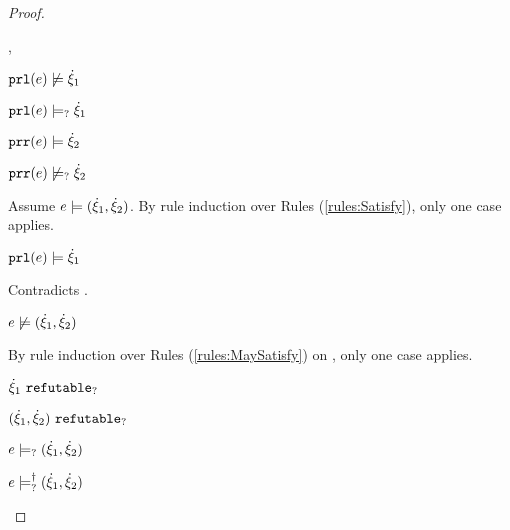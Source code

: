 \begin{proof}
\begin{byCases}
\begin{byCases}
\begin{byCases}
        \item[\cmaysatisfy{\hprl{e}}{\hxi_1},\csatisfy{\hprr{e}}{\hxi_2}]
            \begin{pfsteps*}
            \item $\mathtt{prl}(e) \not\models \dot{\xi}_1$  
            \item $\mathtt{prl}(e) \models_{?} \dot{\xi}_1$  
            \item $\mathtt{prr}(e) \models \dot{\xi}_2$  
            \item $\mathtt{prr}(e) \not\models_{?} \dot{\xi}_2$  
            \end{pfsteps*}
            Assume $e \models (\dot{\xi}_1 , \dot{\xi}_2)$. By rule induction over Rules (\ref{rules:Satisfy}), only one case applies.
            \begin{byCases}
            \item[\text{(\ref{rule:CSNotIntroPair})}]
                \begin{pfsteps*}
                \item $\mathtt{prl}(e) \models \dot{\xi}_1$ 
                \end{pfsteps*}
                Contradicts .
            \end{byCases}
            \begin{pfsteps*}
            \item $e \not\models (\dot{\xi}_1 , \dot{\xi}_2)$  
            \end{pfsteps*}
            By rule induction over Rules (\ref{rules:MaySatisfy}) on , only one case applies. 
            \begin{byCases}
            \item[\text{(\ref{rule:CMSNotIntro})}]
                \begin{pfsteps*}
                \item $\dot{\xi}_1 ~\mathtt{refutable}_?$  
                \item $(\dot{\xi}_1 , \dot{\xi}_2) ~\mathtt{refutable}_?$  
                \item $e \models_{?} (\dot{\xi}_1 , \dot{\xi}_2)$  
                \item $e \models_{?}^{\dag} (\dot{\xi}_1 , \dot{\xi}_2)$ 
                \end{pfsteps*}
            \end{byCases}
            

\end{byCases}
\end{byCases}
\end{byCases}
\end{proof}
